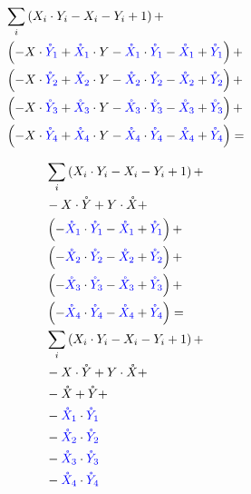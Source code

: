 \documentclass[a4paper]{article}
\newcommand{\Xp}[1]{X_{#1}}
\newcommand{\Xn}[1]{{\color{blue}\mathring{X}_{#1}}}
\newcommand{\Yp}[1]{Y_{#1}}
\newcommand{\Yn}[1]{{\color{blue}\mathring{Y}_{#1}}}
\begin{document}
\begin{align*}
%
  &\sum_{i} \left( \Xp{i} \cdot \Yp{i} - \Xp{i} - \Yp{i} + 1 \right) + \\
  &\left( - X \cdot \Yn{1} + \Xn{1} \cdot Y - \Xn{1} \cdot \Yn{1} - \Xn{1}  + \Yn{1} \right) + \\
  &\left( - X \cdot \Yn{2} + \Xn{2} \cdot Y - \Xn{2} \cdot \Yn{2} - \Xn{2}  + \Yn{2} \right) + \\
  &\left( - X \cdot \Yn{3} + \Xn{3} \cdot Y - \Xn{3} \cdot \Yn{3} - \Xn{3}  + \Yn{3} \right) + \\
  &\left( - X \cdot \Yn{4} + \Xn{4} \cdot Y - \Xn{4} \cdot \Yn{4} - \Xn{4}  + \Yn{4} \right) = \\
%
\end{align*}

\begin{align*}
  &\sum_{i} \left( \Xp{i} \cdot \Yp{i} - \Xp{i} - \Yp{i} + 1 \right) + \\
  & - X \cdot \mathring{Y} + Y \cdot \mathring{X} + \\
  &\left( - \Xn{1} \cdot \Yn{1} - \Xn{1}  + \Yn{1} \right) + \\
  &\left( - \Xn{2} \cdot \Yn{2} - \Xn{2}  + \Yn{2} \right) + \\
  &\left( - \Xn{3} \cdot \Yn{3} - \Xn{3}  + \Yn{3} \right) + \\
  &\left( - \Xn{4} \cdot \Yn{4} - \Xn{4}  + \Yn{4} \right) = \\
%
  &\sum_{i} \left( \Xp{i} \cdot \Yp{i} - \Xp{i} - \Yp{i} + 1 \right) + \\
  & - X \cdot \mathring{Y} + Y \cdot \mathring{X} + \\
  & - \mathring{X} + \mathring{Y} + \\
  & - \Xn{1} \cdot \Yn{1} \\
  & - \Xn{2} \cdot \Yn{2} \\
  & - \Xn{3} \cdot \Yn{3} \\
  & - \Xn{4} \cdot \Yn{4}
\end{align*}
\end{document}
